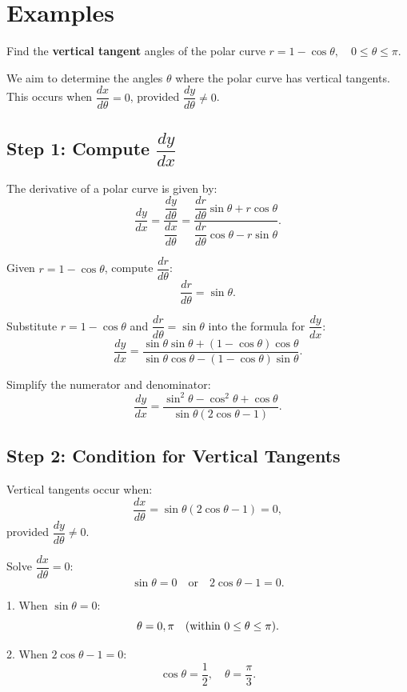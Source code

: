 \documentclass{article}
\begin{document}
\section*{Examples}
\begin{examplebox}
Find the \textbf{vertical tangent} angles of the polar curve \( r = 1 - \cos\theta, \quad 0 \leq \theta \leq \pi \).

\begin{solutionbox}
We aim to determine the angles \( \theta \) where the polar curve has vertical tangents. This occurs when \( \dfrac{dx}{d\theta} = 0 \), provided \( \dfrac{dy}{d\theta} \neq 0 \).

\subsection*{Step 1: Compute \( \dfrac{dy}{dx} \)}
The derivative of a polar curve is given by:
\[
    \dfrac{dy}{dx} = \dfrac{\dfrac{dy}{d\theta}}{\dfrac{dx}{d\theta}} = 
    \dfrac{\dfrac{dr}{d\theta}\sin\theta + r\cos\theta}{\dfrac{dr}{d\theta}\cos\theta - r\sin\theta}.
\]

Given \( r = 1 - \cos\theta \), compute \( \dfrac{dr}{d\theta} \):
\[
    \dfrac{dr}{d\theta} = \sin\theta.
\]

Substitute \( r = 1 - \cos\theta \) and \( \dfrac{dr}{d\theta} = \sin\theta \) into the formula for \( \dfrac{dy}{dx} \):
\[
    \dfrac{dy}{dx} = 
    \dfrac{\sin\theta\sin\theta + (1 - \cos\theta)\cos\theta}{\sin\theta\cos\theta - (1 - \cos\theta)\sin\theta}.
\]

Simplify the numerator and denominator:
\[
    \dfrac{dy}{dx} = 
    \dfrac{\sin^2\theta - \cos^2\theta + \cos\theta}{\sin\theta(2\cos\theta - 1)}.
\]

\subsection*{Step 2: Condition for Vertical Tangents}
Vertical tangents occur when:
\[
    \dfrac{dx}{d\theta} = \sin\theta(2\cos\theta - 1) = 0,
\]
provided \( \dfrac{dy}{d\theta} \neq 0 \).

Solve \( \dfrac{dx}{d\theta} = 0 \):
\[
    \sin\theta = 0 \quad \text{or} \quad 2\cos\theta - 1 = 0.
\]

1. When \( \sin\theta = 0 \):
   \[
       \theta = 0, \pi \quad \text{(within \( 0 \leq \theta \leq \pi \))}.
   \]

2. When \( 2\cos\theta - 1 = 0 \):
   \[
       \cos\theta = \dfrac{1}{2}, \quad \theta = \dfrac{\pi}{3}.
   \]


\end{solutionbox}
\end{examplebox}
\end{document}
